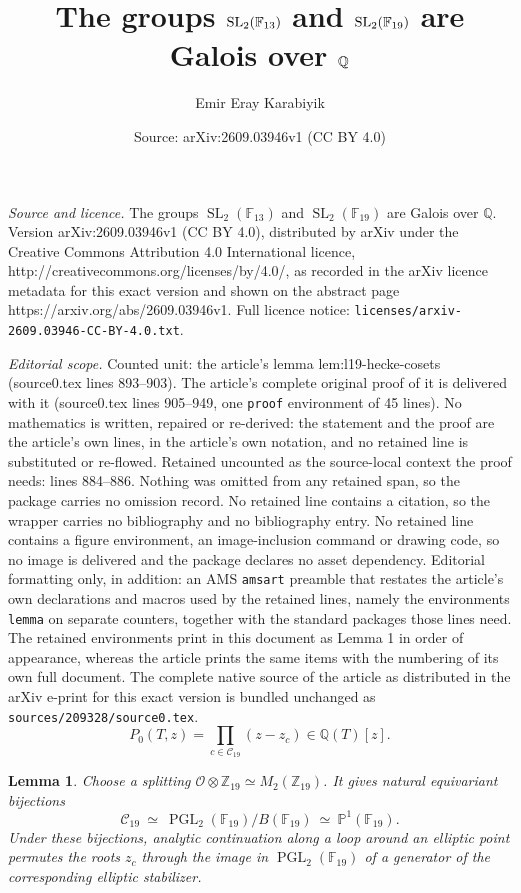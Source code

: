 \documentclass[10pt,a4paper]{amsart}
\title{The groups $\SL_2(\F_{13})$ and $\SL_2(\F_{19})$ are Galois over $\Q$}
\author{Emir Eray Karabiyik}
\date{Source: arXiv:2609.03946v1 (CC BY 4.0)}
\newcommand{\SL}{\operatorname{SL}}
\newtheorem{lemma}{Lemma}
\newcommand{\F}{\mathbb{F}}
\newcommand{\PGL}{\operatorname{PGL}}
\newcommand{\PP}{\mathbb P}
\newcommand{\Q}{\mathbb{Q}}
\newcommand{\Z}{\mathbb{Z}}
\begin{document}
\maketitle

\noindent\emph{Source and licence.} The groups $\SL_2(\F_{13})$ and $\SL_2(\F_{19})$ are Galois over $\Q$. Version arXiv:2609.03946v1 (CC BY 4.0), distributed by arXiv under the Creative Commons Attribution 4.0 International licence, http://creativecommons.org/licenses/by/4.0/, as recorded in the arXiv licence metadata for this exact version and shown on the abstract page https://arxiv.org/abs/2609.03946v1. Full licence notice: \texttt{licenses/arxiv-2609.03946-CC-BY-4.0.txt}.\par\smallskip

\noindent\textit{Editorial scope.} Counted unit: the article's lemma lem:l19-hecke-cosets (source0.tex lines 893--903). The article's complete original proof of it is delivered with it (source0.tex lines 905--949, one \texttt{proof} environment of 45 lines). No mathematics is written, repaired or re-derived: the statement and the proof are the article's own lines, in the article's own notation, and no retained line is substituted or re-flowed.  Retained uncounted as the source-local context the proof needs: lines 884--886.  Nothing was omitted from any retained span, so the package carries no omission record.  No retained line contains a citation, so the wrapper carries no bibliography and no bibliography entry.  No retained line contains a figure environment, an image-inclusion command or drawing code, so no image is delivered and the package declares no asset dependency.  Editorial formatting only, in addition: an AMS \texttt{amsart} preamble that restates the article's own declarations and macros used by the retained lines, namely the environments \texttt{lemma} on separate counters, together with the standard packages those lines need.  The retained environments print in this document as Lemma 1 in order of appearance, whereas the article prints the same items with the numbering of its own full document.  The complete native source of the article as distributed in the arXiv e-print for this exact version is bundled unchanged as \texttt{sources/209328/source0.tex}.
\begin{equation}\label{eq:yang-defining-product}
 P_0(T,z)=\prod_{c\in\mathcal C_{19}}(z-z_c)\in\Q(T)[z].
\end{equation}

\begin{lemma}\label{lem:l19-hecke-cosets}
Choose a splitting $\mathcal O\otimes\Z_{19}\simeq M_2(\Z_{19})$. It
gives natural equivariant bijections
\[
 \mathcal C_{19}\ \simeq\
 \PGL_2(\F_{19})/B(\F_{19})\ \simeq\ \PP^1(\F_{19}).
\] 
Under these bijections, analytic continuation along a loop around an elliptic
point permutes the roots $z_c$ through the image in $\PGL_2(\F_{19})$ of a
generator of the corresponding elliptic stabilizer.
\end{lemma}
\end{document}
